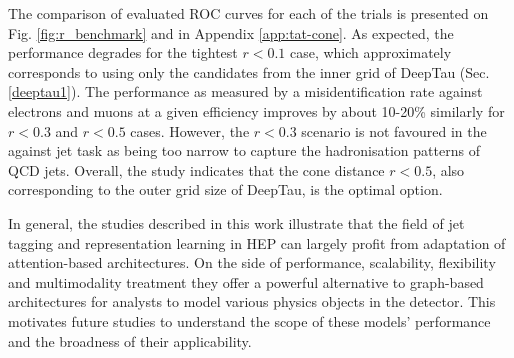 The comparison of evaluated ROC curves for each of the trials is presented on Fig. \ref{fig:r_benchmark} and in Appendix \ref{app:tat-cone}. As expected, the performance degrades for the tightest $r < 0.1$ case, which approximately corresponds to using only the candidates from the inner grid of DeepTau (Sec. \ref{deeptau1}). The performance as measured by a misidentification rate against electrons and muons at a given \tauh efficiency improves by about 10-20\% similarly for $r < 0.3$ and $r < 0.5$ cases. However, the $r < 0.3$ scenario is not favoured in the against jet task as being too narrow to capture the hadronisation patterns of QCD jets. Overall, the study indicates that the cone distance $r < 0.5$, also corresponding to the outer grid size of DeepTau, is the optimal option.  

In general, the studies described in this work illustrate that the field of jet tagging and representation learning in HEP can largely profit from adaptation of attention-based architectures. On the side of performance, scalability, flexibility and multimodality treatment they offer a powerful alternative to graph-based architectures for analysts to model various physics objects in the detector. This motivates future studies to understand the scope of these models' performance and the broadness of their applicability.